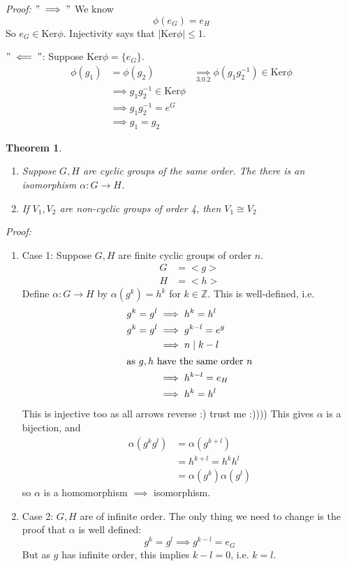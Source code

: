 \documentclass{report}
\newtheorem{theorem}{Theorem}[subsection]
\theoremstyle{remark}
\theoremstyle{definition}
\theoremstyle{definition}
\theoremstyle{theorem}
\begin{document}
\emph{Proof:} $"\implies"$ We know
\[\phi(e_G)=e_H\]
So $e_G \in \mathrm{Ker}\phi$. Injectivity says that $|\mathrm{Ker}\phi| \leq 1$.\par
$"\impliedby"$: Suppose $\mathrm{Ker}\phi=\{e_G\}$.
\begin{align*}
\phi(g_1)&=\phi(g_2) &\underset{\text{3.0.2}}{\implies} \phi(g_1g_2^{-1}) \in \mathrm{Ker}\phi\\
& \implies g_1g_2^{-1} \in \mathrm{Ker}\phi\\
&\implies g_1g_2^{-1}=e^G\\
&\implies g_1=g_2
\end{align*}
\begin{theorem}
\begin{enumerate}[label=\textcircled{\tiny{\arabic*}}]
    \item Suppose $G,H$ are cyclic groups of the same order. The there is an isomorphism $\alpha: G \rightarrow H$.
    \item If $V_1, V_2$ are non-cyclic groups of order 4, then $V_1 \cong V_2$
\end{enumerate}
\end{theorem}
\emph{Proof:}
\begin{enumerate}[label=\textcircled{\tiny{\arabic*}}]
    \item Case 1: Suppose $G,H$ are finite cyclic groups of order $n$. 
    \begin{align*}
        G&=<g>\\
        H&=<h>
    \end{align*}
    Define $\alpha:G \rightarrow H$ by $\alpha(g^k)=h^k$ for $k \in \mathbb{Z}$. This is well-defined, i.e.
    \begin{align*}
        g^k=g^l &\implies h^k = h^l\\
        g^k=g^l &\implies g^{k-l}=e^g\\
        &\implies n \mid k-l\\
        \intertext{as $g,h$ have the same order $n$}
        &\implies h^{k-l}=e_H\\
        &\implies h^k=h^l
    \end{align*}
    This is injective too as all arrows reverse :) trust me :)))) This gives $\alpha$ is a bijection, and
    \begin{align*}
        \alpha(g^kg^l)&=\alpha(g^{k+l})\\
        &=h^{k+l}=h^kh^l\\
        &=\alpha(g^k)\alpha(g^l)
    \end{align*}
    so $\alpha$ is a homomorphism $\implies$ isomorphism.
    \item Case 2: $G,H$ are of infinite order. The only thing we need to change is the proof that $\alpha$ is well defined:
    \[g^k=g^l \implies g^{k-l}=e_G\]
    But as $g$ has infinite order, this implies $k-l=0$, i.e. $k=l$.
\end{enumerate}
\end{document}
